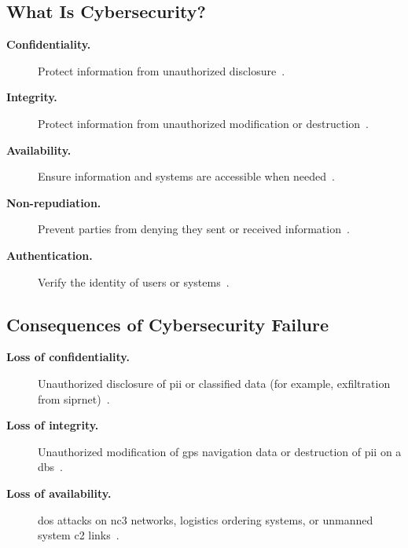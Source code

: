 \documentclass[../main.tex]{subfiles}
\begin{document}
\subsection{What Is Cybersecurity?}
\begin{description}
  \item[\textbf{Confidentiality.}] Protect information from unauthorized disclosure~\autocite{edo-3-4-3-cybersecurity-awareness-2025}.
  \item[\textbf{Integrity.}] Protect information from unauthorized modification or destruction~\autocite{edo-3-4-3-cybersecurity-awareness-2025}.
  \item[\textbf{Availability.}] Ensure information and systems are accessible when needed~\autocite{edo-3-4-3-cybersecurity-awareness-2025}.
  \item[\textbf{Non-repudiation.}] Prevent parties from denying they sent or received information~\autocite{edo-3-4-3-cybersecurity-awareness-2025}.
  \item[\textbf{Authentication.}] Verify the identity of users or systems~\autocite{edo-3-4-3-cybersecurity-awareness-2025}.
\end{description}

\subsection{Consequences of Cybersecurity Failure}
\begin{description}
  \item[\textbf{Loss of confidentiality.}] Unauthorized disclosure of \ac{pii} or classified data (for example, exfiltration from \ac{siprnet})~\autocite{edo-3-4-3-cybersecurity-awareness-2025}.
  \item[\textbf{Loss of integrity.}] Unauthorized modification of \ac{gps} navigation data or destruction of \ac{pii} on a \ac{dbs}~\autocite{edo-3-4-3-cybersecurity-awareness-2025}.
  \item[\textbf{Loss of availability.}] \ac{dos} attacks on \ac{nc3} networks, logistics ordering systems, or unmanned system \ac{c2} links~\autocite{edo-3-4-3-cybersecurity-awareness-2025}.
\end{description}
\end{document}
